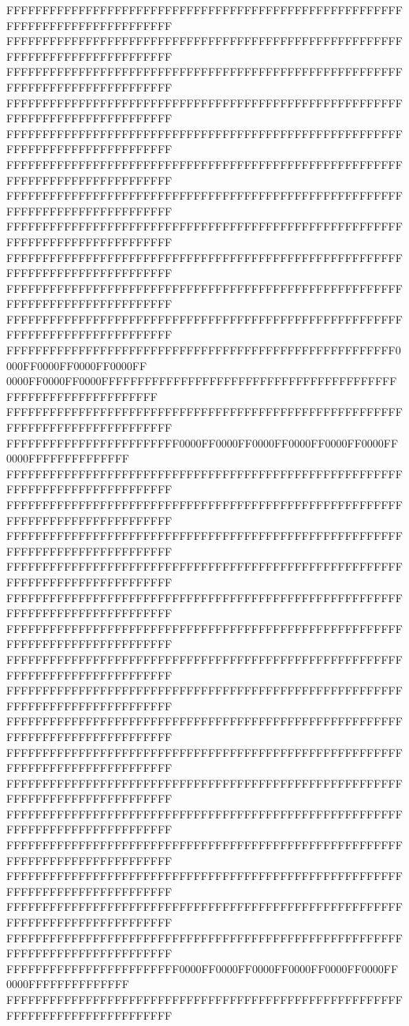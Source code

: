 FFFFFFFFFFFFFFFFFFFFFFFFFFFFFFFFFFFFFFFFFFFFFFFFFFFFFFFFFFFFFFFFFFFFFFFFFFFFFF
FFFFFFFFFFFFFFFFFFFFFFFFFFFFFFFFFFFFFFFFFFFFFFFFFFFFFFFFFFFFFFFFFFFFFFFFFFFFFF
FFFFFFFFFFFFFFFFFFFFFFFFFFFFFFFFFFFFFFFFFFFFFFFFFFFFFFFFFFFFFFFFFFFFFFFFFFFFFF
FFFFFFFFFFFFFFFFFFFFFFFFFFFFFFFFFFFFFFFFFFFFFFFFFFFFFFFFFFFFFFFFFFFFFFFFFFFFFF
FFFFFFFFFFFFFFFFFFFFFFFFFFFFFFFFFFFFFFFFFFFFFFFFFFFFFFFFFFFFFFFFFFFFFFFFFFFFFF
FFFFFFFFFFFFFFFFFFFFFFFFFFFFFFFFFFFFFFFFFFFFFFFFFFFFFFFFFFFFFFFFFFFFFFFFFFFFFF
FFFFFFFFFFFFFFFFFFFFFFFFFFFFFFFFFFFFFFFFFFFFFFFFFFFFFFFFFFFFFFFFFFFFFFFFFFFFFF
FFFFFFFFFFFFFFFFFFFFFFFFFFFFFFFFFFFFFFFFFFFFFFFFFFFFFFFFFFFFFFFFFFFFFFFFFFFFFF
FFFFFFFFFFFFFFFFFFFFFFFFFFFFFFFFFFFFFFFFFFFFFFFFFFFFFFFFFFFFFFFFFFFFFFFFFFFFFF
FFFFFFFFFFFFFFFFFFFFFFFFFFFFFFFFFFFFFFFFFFFFFFFFFFFFFFFFFFFFFFFFFFFFFFFFFFFFFF
FFFFFFFFFFFFFFFFFFFFFFFFFFFFFFFFFFFFFFFFFFFFFFFFFFFFFFFFFFFFFFFFFFFFFFFFFFFFFF
FFFFFFFFFFFFFFFFFFFFFFFFFFFFFFFFFFFFFFFFFFFFFFFFFFFFFF0000FF0000FF0000FF0000FF
0000FF0000FF0000FFFFFFFFFFFFFFFFFFFFFFFFFFFFFFFFFFFFFFFFFFFFFFFFFFFFFFFFFFFFFF
FFFFFFFFFFFFFFFFFFFFFFFFFFFFFFFFFFFFFFFFFFFFFFFFFFFFFFFFFFFFFFFFFFFFFFFFFFFFFF
FFFFFFFFFFFFFFFFFFFFFFFF0000FF0000FF0000FF0000FF0000FF0000FF0000FFFFFFFFFFFFFF
FFFFFFFFFFFFFFFFFFFFFFFFFFFFFFFFFFFFFFFFFFFFFFFFFFFFFFFFFFFFFFFFFFFFFFFFFFFFFF
FFFFFFFFFFFFFFFFFFFFFFFFFFFFFFFFFFFFFFFFFFFFFFFFFFFFFFFFFFFFFFFFFFFFFFFFFFFFFF
FFFFFFFFFFFFFFFFFFFFFFFFFFFFFFFFFFFFFFFFFFFFFFFFFFFFFFFFFFFFFFFFFFFFFFFFFFFFFF
FFFFFFFFFFFFFFFFFFFFFFFFFFFFFFFFFFFFFFFFFFFFFFFFFFFFFFFFFFFFFFFFFFFFFFFFFFFFFF
FFFFFFFFFFFFFFFFFFFFFFFFFFFFFFFFFFFFFFFFFFFFFFFFFFFFFFFFFFFFFFFFFFFFFFFFFFFFFF
FFFFFFFFFFFFFFFFFFFFFFFFFFFFFFFFFFFFFFFFFFFFFFFFFFFFFFFFFFFFFFFFFFFFFFFFFFFFFF
FFFFFFFFFFFFFFFFFFFFFFFFFFFFFFFFFFFFFFFFFFFFFFFFFFFFFFFFFFFFFFFFFFFFFFFFFFFFFF
FFFFFFFFFFFFFFFFFFFFFFFFFFFFFFFFFFFFFFFFFFFFFFFFFFFFFFFFFFFFFFFFFFFFFFFFFFFFFF
FFFFFFFFFFFFFFFFFFFFFFFFFFFFFFFFFFFFFFFFFFFFFFFFFFFFFFFFFFFFFFFFFFFFFFFFFFFFFF
FFFFFFFFFFFFFFFFFFFFFFFFFFFFFFFFFFFFFFFFFFFFFFFFFFFFFFFFFFFFFFFFFFFFFFFFFFFFFF
FFFFFFFFFFFFFFFFFFFFFFFFFFFFFFFFFFFFFFFFFFFFFFFFFFFFFFFFFFFFFFFFFFFFFFFFFFFFFF
FFFFFFFFFFFFFFFFFFFFFFFFFFFFFFFFFFFFFFFFFFFFFFFFFFFFFFFFFFFFFFFFFFFFFFFFFFFFFF
FFFFFFFFFFFFFFFFFFFFFFFFFFFFFFFFFFFFFFFFFFFFFFFFFFFFFFFFFFFFFFFFFFFFFFFFFFFFFF
FFFFFFFFFFFFFFFFFFFFFFFFFFFFFFFFFFFFFFFFFFFFFFFFFFFFFFFFFFFFFFFFFFFFFFFFFFFFFF
FFFFFFFFFFFFFFFFFFFFFFFFFFFFFFFFFFFFFFFFFFFFFFFFFFFFFFFFFFFFFFFFFFFFFFFFFFFFFF
FFFFFFFFFFFFFFFFFFFFFFFFFFFFFFFFFFFFFFFFFFFFFFFFFFFFFFFFFFFFFFFFFFFFFFFFFFFFFF
FFFFFFFFFFFFFFFFFFFFFFFF0000FF0000FF0000FF0000FF0000FF0000FF0000FFFFFFFFFFFFFF
FFFFFFFFFFFFFFFFFFFFFFFFFFFFFFFFFFFFFFFFFFFFFFFFFFFFFFFFFFFFFFFFFFFFFFFFFFFFFF
